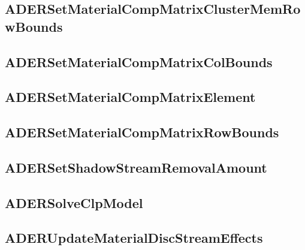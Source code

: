 \subsection{ADERSetMaterialCompMatrixClusterMemRowBounds}


\subsection{ADERSetMaterialCompMatrixColBounds}


\subsection{ADERSetMaterialCompMatrixElement}


\subsection{ADERSetMaterialCompMatrixRowBounds}


\subsection{ADERSetShadowStreamRemovalAmount}


\subsection{ADERSolveClpModel}


\subsection{ADERUpdateMaterialDiscStreamEffects}

